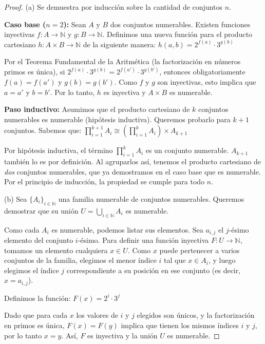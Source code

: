 \documentclass{article}
\theoremstyle{definition}
\newcommand{\N}{\mathbb{N}}
\begin{document}
\begin{proof}
    (a) Se demuestra por inducción sobre la cantidad de conjuntos \(n\).

    \textbf{Caso base (\(n=2\)):} Sean \(A\) y \(B\) dos conjuntos numerables. Existen funciones inyectivas \(f: A \to \N\) y \(g: B \to \N\). Definimos una nueva función para el producto cartesiano \(h: A \times B \to \N\) de la siguiente manera:
    \(h(a, b) = 2^{f(a)} \cdot 3^{g(b)}\)

    Por el Teorema Fundamental de la Aritmética (la factorización en números primos es única), si \(2^{f(a)} \cdot 3^{g(b)} = 2^{f(a')} \cdot 3^{g(b')}\), entonces obligatoriamente \(f(a) = f(a')\) y \(g(b) = g(b')\). Como \(f\) y \(g\) son inyectivas, esto implica que \(a = a'\) y \(b = b'\). Por lo tanto, \(h\) es inyectiva y \(A \times B\) es numerable.

    \textbf{Paso inductivo:} Asumimos que el producto cartesiano de \(k\) conjuntos numerables es numerable (hipótesis inductiva). Queremos probarlo para \(k+1\) conjuntos. Sabemos que:
    \(\prod_{i=1}^{k+1} A_i \cong \left( \prod_{i=1}^{k} A_i \right) \times A_{k+1}\)

    Por hipótesis inductiva, el término \(\prod_{i=1}^{k} A_i\) es un conjunto numerable. \(A_{k+1}\) también lo es por definición. Al agruparlos así, tenemos el producto cartesiano de \textit{dos} conjuntos numerables, que ya demostramos en el caso base que es numerable. Por el principio de inducción, la propiedad se cumple para todo \(n\).

    (b) Sea \( {\{A_i \}}_{i \in \N}\) una familia numerable de conjuntos numerables. Queremos demostrar que su unión \(U = \bigcup_{i \in \N} A_i\) es numerable.

    Como cada \(A_i\) es numerable, podemos listar sus elementos. Sea \(a_{i,j}\) el \(j\)-ésimo elemento del conjunto \(i\)-ésimo.
    Para definir una función inyectiva \(F: U \to \N\), tomamos un elemento cualquiera \(x \in U\). Como \(x\) puede pertenecer a varios conjuntos de la familia, elegimos el menor índice \(i\) tal que \(x \in A_i\), y luego elegimos el índice \(j\) correspondiente a su posición en ese conjunto (es decir, \(x = a_{i,j}\)).

    Definimos la función:
    \(F(x) = 2^i \cdot 3^j\)

    Dado que para cada \(x\) los valores de \(i\) y \(j\) elegidos son únicos, y la factorización en primos es única, \(F(x) = F(y)\) implica que tienen los mismos índices \(i\) y \(j\), por lo tanto \(x = y\). Así, \(F\) es inyectiva y la unión \(U\) es numerable.


\end{proof}
\end{document}
